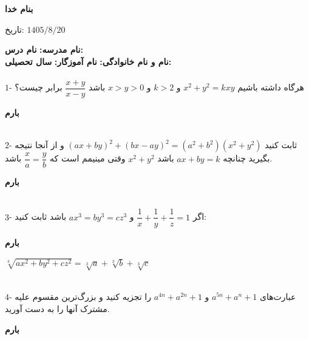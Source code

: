 \documentclass[a4paper,14pt]{article}
\begin{document}
\fancypage{\setlength{\fboxrule}{0.5mm}\fbox}{}	
	
\thispagestyle{empty}	
\begin{center}
\textbf{
 بنام خدا
}
\end{center}
\vspace*{-1.5cm}
\begin{flushleft}
تاریخ: 
$1405/8/20$
\end{flushleft}
\textbf{
نام مدرسه:
}	
\hspace{11cm}
\textbf{
نام درس:
}
\\
\textbf{
نام و نام خانوادگی:
}	
\hspace{3.5cm}
\textbf{
نام آموزگار:
}
\hspace{3.5cm}
\textbf{
سال تحصیلی:
}
\\		 
\noindent\makebox[\textwidth]{\rule{19cm}{1pt}}
\\	
$1$-	
هرگاه داشته باشیم 
$x^{2}+y^{2}=kxy$
و 
$k>2$
و 
$x>y>0$ 
باشد 
$\dfrac{x+y}{x-y}$
برابر چیست؟ 
\vspace*{-1.3cm}
\begin{flushleft}
\textbf{بارم}
\end{flushleft}
\noindent\makebox[\textwidth]{\rule{19cm}{1pt}}
\\		
$2$-
ثابت کنید 
$(ax+by)^{2}+(bx-ay)^{2}=(a^{2}+b^{2})(x^{2}+y^{2})$	
و از آنجا نتیجه بگیرید چنانچه 
$ax+by=k$
باشد 
$x^{2}+y^{2}$
وقتی مینیمم است که 
$\dfrac{x}{a}=\dfrac{y}{b}$
باشد.
\vspace*{-1.3cm}
\begin{flushleft}
\textbf{بارم}
\end{flushleft}	 
\noindent\makebox[\textwidth]{\rule{19cm}{1pt}}
\\	
$3$-
اگر 
$\dfrac{1}{x}+\dfrac{1}{y}+\dfrac{1}{z}=1$
و 
$ax^{3}=by^{3}=cz^{3}$
باشد ثابت کنید:
\vspace*{-1.3cm}
\begin{flushleft}
\textbf{بارم}
\end{flushleft}
\begin{flushleft}
$\sqrt[3]{ax^{2}+by^{2}+cz^{2}}=\sqrt[3]{a}+\sqrt[3]{b}+\sqrt[3]{c}$
\end{flushleft}		
\noindent\makebox[\textwidth]{\rule{19cm}{1pt}}
\\
$4$-
عبارت‌های 
$a^{5n}+a^{n}+1$
و 
$a^{4n}+a^{2n}+1$
را تجزیه کنید و بزرگ‌ترین مقسوم علیه مشترک آنها را به 
دست آورید.
\\
\vspace*{-1.3cm}
\begin{flushleft}
\textbf{بارم}
\end{flushleft}
\end{document}
